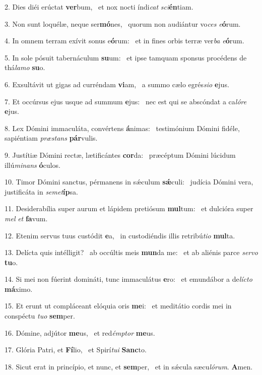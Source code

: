 2. Dies diéi erúctat \textbf{ver}bum, \ast\  et nox nocti índi\textit{cat} \textit{sci}\textbf{én}tiam.\

3. Non sunt loquélæ, neque ser\textbf{mó}nes, \ast\  quorum non audiántur vo\textit{ces} \textit{e}\textbf{ó}rum.\

4. In omnem terram exívit sonus e\textbf{ó}rum: \ast\  et in fines orbis terræ ver\textit{ba} \textit{e}\textbf{ó}rum.\

5. In sole pósuit tabernáculum \textbf{su}um: \ast\  et ipse tamquam sponsus procédens de thá\textit{la}\textit{mo} \textbf{su}o.\

6. Exsultávit ut gigas ad curréndam \textbf{vi}am, \ast\  a summo cælo egrés\textit{si}\textit{o} \textbf{e}jus.\

7. Et occúrsus ejus usque ad summum \textbf{e}jus: \ast\  nec est qui se abscóndat a ca\textit{ló}\textit{re} \textbf{e}jus.\

8. Lex Dómini immaculáta, convértens \textbf{á}nimas: \ast\  testimónium Dómini fidéle, sapiéntiam \textit{præ}\textit{stans} \textbf{pár}vulis.\

9. Justítiæ Dómini rectæ, lætificántes \textbf{cor}da: \ast\  præcéptum Dómini lúcidum illú\textit{mi}\textit{nans} \textbf{ó}culos.\

10. Timor Dómini sanctus, pérmanens in sǽculum \textbf{sǽ}culi: \ast\  judícia Dómini vera, justificáta in \textit{se}\textit{met}\textbf{íp}sa.\

11. Desiderabília super aurum et lápidem pretiósum \textbf{mul}tum: \ast\  et dulcióra super \textit{mel} \textit{et} \textbf{fa}vum.\

12. Etenim servus tuus custódit \textbf{e}a, \ast\  in custodiéndis illis retribú\textit{ti}\textit{o} \textbf{mul}ta.\

13. Delícta quis intélligit? \dag\  ab occúltis meis \textbf{mun}da me: \ast\  et ab aliénis parce \textit{ser}\textit{vo} \textbf{tu}o.\

14. Si mei non fúerint domináti, tunc immaculátus \textbf{e}ro: \ast\  et emundábor a de\textit{líc}\textit{to} \textbf{má}ximo.\

15. Et erunt ut compláceant elóquia oris \textbf{me}i: \ast\  et meditátio cordis mei in conspéctu \textit{tu}\textit{o} \textbf{sem}per.\

16. Dómine, adjútor \textbf{me}us, \ast\  et red\textit{émp}\textit{tor} \textbf{me}us.\

17. Glória Patri, et \textbf{Fí}lio, \ast\  et Spirí\textit{tu}\textit{i} \textbf{Sanc}to.\

18. Sicut erat in princípio, et nunc, et \textbf{sem}per, \ast\  et in sǽcula sæcu\textit{ló}\textit{rum}. \textbf{A}men.\

